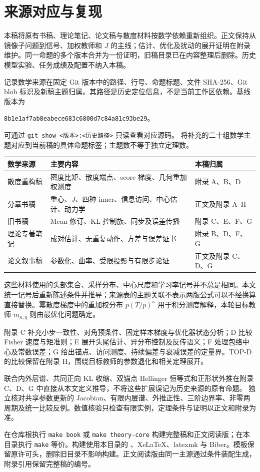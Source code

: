 \chapter*{来源对应与复现}
本稿将原有书稿、理论笔记、论文稿与散度材料按数学依赖重新组织。正文保持从镜像子问题到信号、加权教师和 $J$ 的主线；估计、优化及扰动的展开证明在附录维护。同一命题的多个版本合并为一份证明，旧稿目录已在内容整理后删除。历史模型实验、任务成绩及配置不纳入本稿。

 记录数学来源在固定 Git 版本中的路径、行号、命题标题、文件 SHA-256、Git blob 标识及新稿主题归属。其路径是历史定位信息，不是当前工作区依赖。基线版本为
\begin{center}
\texttt{8b1e1af7ab8eabece683c6800d7c84a81c93be29}。
\end{center}
可通过 \texttt{git show <版本>:<历史路径>} 只读查看对应源码。
 将补充的二十组数学主题对应到当前稿的具体命题标签；主题数不等于独立定理数。

\begin{longtable}{p{24mm}p{57mm}p{47mm}}
\toprule
数学来源 & 主要内容 & 本稿归属\\
\midrule
\endhead
散度重构稿 & 密度比矩、散度端点、score 梯度、几何重加权测度 & 附录 A、B、D\\
分章书稿 & 重心、$J$、四种 inner、信息访问、中心估计、动力学 & 正文及附录 A--H\\
旧书稿 & Mean 修订、KL 控制族、同步及误差传播 & 附录 C、E、F、G\\
理论专著笔记 & 成对估计、无重复动作、方差与误差证书 & 附录 B、D、F、G\\
论文叙事稿 & 参数化、曲率、受限投影与有限步论证 & 正文及附录 C、D、G\\
\bottomrule
\end{longtable}

这些材料使用的头部集合、采样分布、中心尺度和学习率记号并不总是相同。本文统一记号后重新陈述条件并推导；来源表的主题关联不表示两版公式可以不经换算直接替换。幂散度梯度中的重加权分布 $p(T/p)^\kappa$ 用于积分测度解释，本轮目标教师 $m_{\kappa,\eta}$ 则由最优化问题确定。

附录 C 补充小步一致性、对角预条件、固定样本梯度与优化器状态分析；D 比较 Fisher 速度与矩准则；E 展开头尾估计、异分布控制及反传语义；F 处理包络中心及常数误差；G 给出锚点、访问测度、持续偏差与衰减误差的定量界。TOP-D 的比较保留在附录 H，围绕目标教师的参数退化和相关定理展开。



联合内外层谱、共同正向 KL 收缩、双锚点 Hellinger 恒等式和正形状外推在附录 C、D、G 中直接从本文定义推导，不将这些扩展误记为历史来源的原有命题。 独立核对共享参数更新的 Jacobian、有限内层谱、外推正性、三阶边界率、非零两周期及统一比较反例。数值核验只检查有限实例，定理条件与证明以正文和附录为准。

在仓库根执行 \texttt{make book} 或 \texttt{make theory-core} 构建完整稿和正文阅读版；在本目录执行 \texttt{make} 等价。构建使用本目录的 、XeLaTeX、latexmk 与 Biber。模板保留原许可头，删除旧目录不影响构建。正文阅读版由同一主源通过条件装配生成，附录引用保留完整稿的编号。
